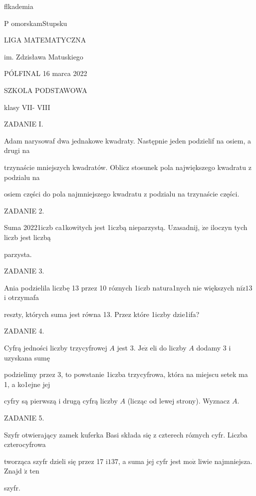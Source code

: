 \documentclass[a4paper,12pt]{article}
\begin{document}
flkademia

P omorskamStupsku

LIGA MATEMATYCZNA

im. Zdzisława Matuskiego

PÓLFINAL 16 marca 2022

SZKOLA PODSTAWOWA

klasy VII- VIII

ZADANIE I.

Adam narysowaf dwa jednakowe kwadraty. Następnie jeden podzielif na osiem, a drugi na

trzynaście mniejszych kwadratów. Oblicz stosunek pola największego kwadratu z podzialu na

osiem części do pola najmniejszego kwadratu z podzialu na trzynaście części.

ZADANIE 2.

Suma 20221iczb ca1kowitych jest 1iczbą nieparzystą. Uzasadnij, $\dot{\mathrm{z}}\mathrm{e}$ iloczyn tych liczb jest liczbą

parzysta.

ZADANIE 3.

Ania podzielila liczbę 13 przez 10 róznych 1iczb natura1nych nie większych $\mathrm{n}\mathrm{i}\dot{\mathrm{z}}13$ i otrzymafa

reszty, których suma jest równa 13. Przez które 1iczby dzie1ifa?

ZADANIE 4.

Cyfrą jedności liczby trzycyfrowej $A$ jest 3. $\mathrm{J}\mathrm{e}\dot{\mathrm{z}}$ eli do liczby $A$ dodamy 3 i uzyskana sumę

podzielimy przez 3, to powstanie 1iczba trzycyfrowa, która na miejscu setek ma 1, a ko1ejne jej

cyfry są pierwszą i drugą cyfrą liczby $A$ (licząc od lewej strony). Wyznacz $A.$

ZADANIE 5.

Szyfr otwierający zamek kuferka Basi składa się z czterech róznych cyfr. Liczba czterocyfrowa

tworząca szyfr dzieli się przez 17 $\mathrm{i}137$, a suma jej cyfr jest $\mathrm{m}\mathrm{o}\dot{\mathrm{z}}$ liwie najmniejsza. Znajd $\acute{\mathrm{z}}$ ten

szyfr.
\end{document}
